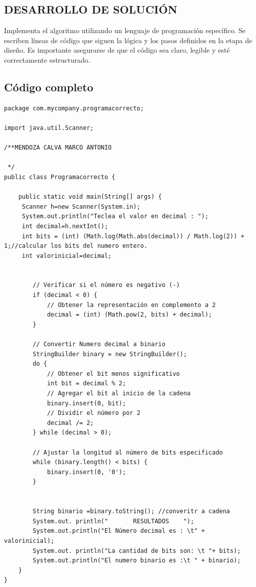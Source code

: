 \subsection{\textbf{DESARROLLO DE SOLUCIÓN }}
Implementa el algoritmo utilizando un lenguaje de programación específico. Se escriben líneas de código que siguen la lógica y los pasos definidos en la etapa de diseño. Es importante asegurarse de que el código sea claro, legible y esté correctamente estructurado.
\subsection{\textbf{Código completo}}
\begin{lstlisting}[style=javaStyle]
package com.mycompany.programacorrecto;

import java.util.Scanner;

/**MENDOZA CALVA MARCO ANTONIO

 */
public class Programacorrecto {

    public static void main(String[] args) {
     Scanner h=new Scanner(System.in);
     System.out.println("Teclea el valor en decimal : ");
     int decimal=h.nextInt();
     int bits = (int) (Math.log(Math.abs(decimal)) / Math.log(2)) + 1;//calcular los bits del numero entero.
     int valorinicial=decimal;    
    
       
        // Verificar si el número es negativo (-)
        if (decimal < 0) {
            // Obtener la representación en complemento a 2
            decimal = (int) (Math.pow(2, bits) + decimal);
        }

        // Convertir Numero decimal a binario
        StringBuilder binary = new StringBuilder();
        do {
            // Obtener el bit menos significativo
            int bit = decimal % 2;
            // Agregar el bit al inicio de la cadena
            binary.insert(0, bit);
            // Dividir el número por 2
            decimal /= 2;
        } while (decimal > 0);

        // Ajustar la longitud al número de bits especificado
        while (binary.length() < bits) {
            binary.insert(0, '0');
        }

        
        String binario =binary.toString(); //converitr a cadena 
        System.out. println("       RESULTADOS    ");
        System.out.println("El Número decimal es : \t" + valorinicial);
        System.out. println("La cantidad de bits son: \t "+ bits);
        System.out.println("El numero binario es :\t " + binario);
    }       
}

\end{lstlisting}


